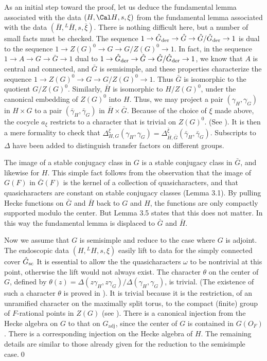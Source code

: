 As an initial step toward the proof, let us deduce the fundamental
lemma associated with the data  $(H,{\Cal H},s,\xi)$
from the fundamental lemma associated with the data
$(\bar H,{}^L\!\bar H,s,\bar\xi)$.
There is nothing difficult here, but a number of small facts
must be checked.  The sequence $1\to \hat G_{\text{der}}\to\hat G
\to \hat G/\hat G_{\text{der}}\to 1$ is dual to the sequence
$1\to Z(G)^0 \to G \to G/Z(G)^0\to 1$.  In fact, in the
sequence $1\to A\to G\to \bar G\to 1$ dual to 
$1\to  \hat G_{\text{der}}\to\hat G\to\hat G/\hat G_{\text{der}}\to 1$,
we know that 
$A$ is central and connected, and $\bar G$ is semisimple, and these properties
characterize the sequence $1\to Z(G)^0 \to G \to G/Z(G)^0\to 1$.
Thus $\bar G$ is isomorphic to the quotient $G/Z(G)^0$.
Similarly, $\bar H$ is isomorphic to $H/Z(G)^0$, under the canonical
embedding of $Z(G)^0$ into $H$.  Thus, we may project a pair $(\gamma_H,\gamma_G)$
in $H\times G$ to a pair $(\bar \gamma_H,\bar \gamma_G)$ in $\bar H\times
\bar G$.  Because of the choice of $\xi$ made above, the cocycle
$a_\xi$ restricts to a character that is trivial on $Z(G)^0$.
(See \cite{H2,11}).  It is then a mere formality to check that
$\Delta^\xi_{H,G}(\gamma_H,\gamma_G) = \Delta^{\bar \xi}
_{\bar H,\bar G}(\bar \gamma_H,\bar \gamma_G)$.  Subscripts
to $\Delta$ have been added to distinguish transfer factors on
different groups.

The image of a stable conjugacy class in $G$ is a stable conjugacy
class in $\bar G$, and  likewise for $H$.  This simple fact follows
from the observation that the image of $G(F)$ in $\bar G(F)$ is
the kernel of a collection of quasicharacters, and that quasicharacters
are constant on stable conjugacy classes (Lemma 3.1).  By pulling
Hecke functions on $\bar G$ and $\bar H$ back to $G$ and $H$, the
functions are only compactly supported modulo the center. 
But Lemma 3.5 states
that this does not matter.  In this way the fundamental lemma
is displaced to $\bar G$ and $\bar H$.

Now we assume that $G$ is semisimple and reduce to the case where $G$
is adjoint.  The endoscopic data $(H,{}^L\!H,s,\xi)$ easily lift
to data for the simply connected cover $\hat G_{{\text{sc}}}$
It is essential to allow
the the quasicharacters $\omega$ to be nontrivial
at this point, otherwise the lift would not always exist.  The character
$\theta$ on the center of $G$, defined by 
$\theta(z) =\Delta(z\gamma_H,z\gamma_G)/\Delta(\gamma_H,\gamma_G)$,
is trivial.  (The existence of such  a character
$\theta$ is proved in \cite{LS2}).  It
is trivial because it is the restriction, 
of an unramified character on the maximally split torus,
to the compact (finite) group of $F$-rational points in $Z(G)$
(see \cite{H2,11}).
There is a canonical injection from the Hecke algebra on $G$
to that on $G_{\text{adj}}$, since the center of $G$
is contained in $G(O_F)$.  There
is a corresponding injection on the Hecke algebra of $H$.  The
remaining details are similar to those already given for the reduction
to the semisimple case.\qed

